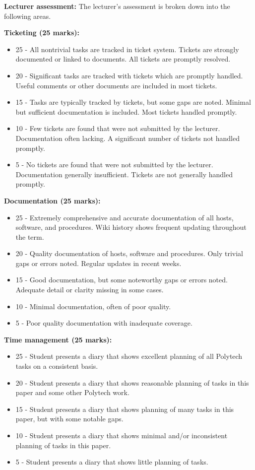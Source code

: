 \documentclass{article}   	%
\begin{document}
\vskip 5mm

\textbf{Lecturer assessment:} The lecturer's assessment is broken down into the following areas.

\textbf{Ticketing (25 marks):}
\begin{itemize}
  \item 25 - All nontrivial tasks are tracked in ticket system. Tickets are strongly documented or linked to documents.  All tickets are promptly resolved.
  \item 20 - Significant tasks are tracked with tickets which are promptly handled.  Useful comments or other documents are included in most tickets.
  \item 15 - Tasks are typically tracked by tickets, but some gaps are noted.  Minimal but sufficient documentation is included.  Most tickets handled promptly.
  \item 10 - Few tickets are found that were not submitted by the lecturer.  Documentation often lacking.  A significant number of tickets not handled promptly.
  \item 5 - No tickets are found that were not submitted by the lecturer.  Documentation generally insufficient.  Tickets are not generally handled promptly.
\end{itemize}

\newpage

\textbf{Documentation (25 marks):}
\begin{itemize}
  \item 25 - Extremely comprehensive and accurate documentation of all hosts, software, and procedures.  Wiki history shows frequent updating throughout the term.
  \item 20 - Quality documentation of hosts, software and procedures.  Only trivial gaps or errors noted.   Regular updates in recent weeks.
  \item 15 - Good documentation, but some noteworthy gaps or errors noted.  Adequate detail or clarity missing in some cases.
  \item 10 - Minimal documentation, often of poor quality.
  \item 5 -  Poor quality documentation with inadequate coverage.
\end{itemize}

\textbf{Time management (25 marks):}
\begin{itemize}
  \item 25 - Student presents a diary that shows excellent planning of all Polytech tasks on a consistent basis.
  \item 20 - Student presents a diary that shows reasonable planning of tasks in this paper and some other Polytech work.
  \item 15 - Student presents a diary that shows planning of many tasks in this paper, but with some notable gaps.
  \item 10 - Student presents a diary that shows minimal and/or inconsistent planning of tasks in this paper.
  \item 5 -  Student presents a diary that shows little planning of tasks.
\end{itemize}
\end{document}
